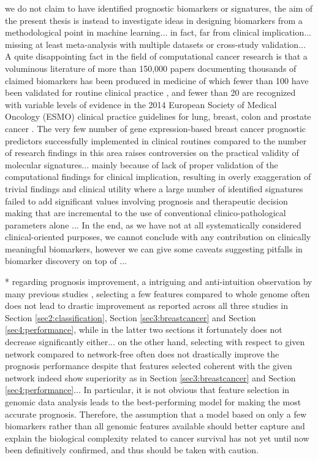 we do not claim to have identified prognostic biomarkers or signatures, the aim of the present thesis is instead to investigate ideas in designing biomarkers from a methodological point in machine learning... in fact, far from clinical implication... missing at least meta-analysis with multiple datasets or cross-study validation... A quite disappointing fact in the field of computational cancer research is that a voluminous literature of more than 150,000 papers documenting thousands of claimed biomarkers has been produced in medicine of which fewer than 100 have been validated for routine clinical practice \cite{Poste2011Bring}, and fewer than 20 are recognized with variable levels of evidence in the 2014 European Society of Medical Oncology (ESMO) clinical practice guidelines for lung, breast, colon and prostate cancer \cite{Schneider2015Establishing}. The very few number of gene expression-based breast cancer prognostic predictors successfully implemented in clinical routines compared to the number of research findings in this area raises controversies on the practical validity of molecular signatures... mainly because of lack of proper validation of the computational findings for clinical implication, resulting in overly exaggeration of trivial findings and clinical utility where a large number of identified signatures failed to add significant values involving prognosis and therapeutic decision making that are incremental to the use of conventional clinico-pathological parameters alone \cite{Michiels2016Statistical}... In the end, as we have not at all systematically considered clinical-oriented purposes, we cannot conclude with any contribution on clinically meaningful biomarkers, however we can give some caveats suggesting pitfalls in biomarker discovery on top of \cite{Ambroise2002Selection, Simon2003Pitfalls}...

* regarding prognosis improvement, a intriguing and anti-intuition observation by many previous studies \cite{Haury2011influence}, selecting a few features compared to whole genome often does not lead to drastic improvement as reported across all three studies in Section \ref{sec2:classification}, Section \ref{sec3:breastcancer} and Section \ref{sec4:performance}, while in the latter two sections it fortunately does not decrease significantly either... on the other hand, selecting with respect to given network compared to network-free often does not drastically improve the prognosis performance despite that features selected coherent with the given network indeed show superiority as in Section \ref{sec3:breastcancer} and Section \ref{sec4:performance}... In particular, it is not obvious that feature selection in genomic data analysis leads to the best-performing model for making the most accurate prognosis. Therefore, the assumption that a model based on only a few biomarkers rather than all genomic features available should better capture and explain the biological complexity related to cancer survival has not yet until now been definitively confirmed, and thus should be taken with caution.

